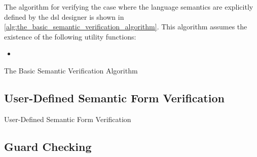 The algorithm for verifying the case where the language semantics are explicitly defined by the \gls{dsl} designer is shown in \autoref{alg:the_basic_semantic_verification_algorithm}.
This algorithm assumes the existence of the following utility functions:
\begin{itemize}
    \item 
\end{itemize}

\begin{algorithm}
\begin{algorithmic}
\EndFunction
\end{algorithmic}
\caption{The Basic Semantic Verification Algorithm}
\label{alg:the_basic_semantic_verification_algorithm}
\end{algorithm}


\subsection{User-Defined Semantic Form Verification} %
\label{sub:user_defined_semantic_form_verification}

\begin{algorithm}
\begin{algorithmic}
    \State
\end{algorithmic}
\caption{User-Defined Semantic Form Verification}
\label{alg:user_defined_semantic_form_verification}
\end{algorithm}


\subsection{Guard Checking} %
\label{sub:guard_checking}

